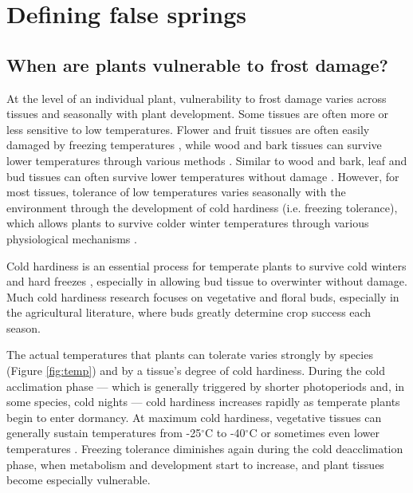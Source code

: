 \documentclass{article}\usepackage[]{graphicx}\usepackage[]{color}
\begin{document}
\section*{Defining false springs} 
\subsection*{When are plants vulnerable to frost damage?} 
At the level of an individual plant, vulnerability to frost damage varies across tissues and seasonally with plant development. Some tissues are often more or less sensitive to low temperatures. Flower and fruit tissues are often easily damaged by freezing temperatures \citep{Augspurger2009, Caradonna2016, Inouye2000, Lenz2013}, while wood and bark tissues can survive lower temperatures through various methods \citep{Strimbeck2015}. Similar to wood and bark, leaf and bud tissues can often survive lower temperatures without damage \citep{Charrier2011}. However, for most tissues, tolerance of low temperatures varies seasonally with the environment through the development of cold hardiness (i.e. freezing tolerance), which allows plants to survive colder winter temperatures through various physiological mechanisms \citep[e.g., deep supercooling, increased solute concentration, and an increase in dehydrins and other proteins][] {Sakai1987, Strimbeck2015}. 

Cold hardiness is an essential process for temperate plants to survive cold winters and hard freezes \citep{Vitasse2014}, especially in allowing bud tissue to overwinter without damage. Much cold hardiness research focuses on vegetative and floral buds, especially in the agricultural literature, where buds greatly determine crop success each season.

The actual temperatures that plants can tolerate varies strongly by species (Figure \ref{fig:temp}) and by a tissue's degree of cold hardiness. During the cold acclimation phase --- which is generally triggered by shorter photoperiods \citep{Howe2003, Charrier2011, Strimbeck2015, Welling1997} and, in some species, cold nights \citep{Charrier2011, Heide2005} --- cold hardiness increases rapidly as temperate plants begin to enter dormancy. At maximum cold hardiness, vegetative tissues can generally sustain temperatures from -25$^{\circ}$C to -40$^{\circ}$C \citep{Charrier2011,Korner2012,Vitasse2014} or sometimes even lower temperatures \citep[to -60$^{\circ}$C in extreme cases,][] {Korner2012}. Freezing tolerance diminishes again during the cold deacclimation phase, when metabolism and development start to increase, and plant tissues become especially vulnerable. 
\end{document}

